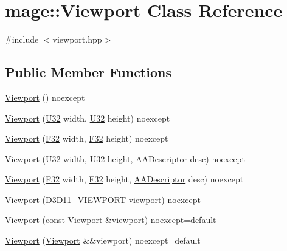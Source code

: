 \hypertarget{classmage_1_1_viewport}{}\section{mage\+:\+:Viewport Class Reference}
\label{classmage_1_1_viewport}


{\ttfamily \#include $<$viewport.\+hpp$>$}

\subsection*{Public Member Functions}
\begin{DoxyCompactItemize}
\item 
\hyperlink{classmage_1_1_viewport_a0bc300b1cb281972538509a0bb19378d}{Viewport} () noexcept
\item 
\hyperlink{classmage_1_1_viewport_ad0950f9c6b628170c6e2431cb0f05044}{Viewport} (\hyperlink{namespacemage_a41c104c036fba3756a74e19f793eeaa1}{U32} width, \hyperlink{namespacemage_a41c104c036fba3756a74e19f793eeaa1}{U32} height) noexcept
\item 
\hyperlink{classmage_1_1_viewport_abd81e3af844e61ef53502142e1239191}{Viewport} (\hyperlink{namespacemage_aa97e833b45f06d60a0a9c4fc22ae02c0}{F32} width, \hyperlink{namespacemage_aa97e833b45f06d60a0a9c4fc22ae02c0}{F32} height) noexcept
\item 
\hyperlink{classmage_1_1_viewport_ae2409efe393934638c97ae28aba21297}{Viewport} (\hyperlink{namespacemage_a41c104c036fba3756a74e19f793eeaa1}{U32} width, \hyperlink{namespacemage_a41c104c036fba3756a74e19f793eeaa1}{U32} height, \hyperlink{namespacemage_a0b400065340fa5cca0ce4c2809d91af1}{A\+A\+Descriptor} desc) noexcept
\item 
\hyperlink{classmage_1_1_viewport_a7cf0146d9a751194ff14e1c457cf3a0e}{Viewport} (\hyperlink{namespacemage_aa97e833b45f06d60a0a9c4fc22ae02c0}{F32} width, \hyperlink{namespacemage_aa97e833b45f06d60a0a9c4fc22ae02c0}{F32} height, \hyperlink{namespacemage_a0b400065340fa5cca0ce4c2809d91af1}{A\+A\+Descriptor} desc) noexcept
\item 
\hyperlink{classmage_1_1_viewport_aba7ead935a561fdf24c631710ad8cbeb}{Viewport} (D3\+D11\+\_\+\+V\+I\+E\+W\+P\+O\+RT viewport) noexcept
\item 
\hyperlink{classmage_1_1_viewport_a13e2f3281c298ca6dded572ad11330ef}{Viewport} (const \hyperlink{classmage_1_1_viewport}{Viewport} \&viewport) noexcept=default
\item 
\hyperlink{classmage_1_1_viewport_a881fcff3291cc87be5cfc6e502ba4a73}{Viewport} (\hyperlink{classmage_1_1_viewport}{Viewport} \&\&viewport) noexcept=default

\end{DoxyCompactItemize}
